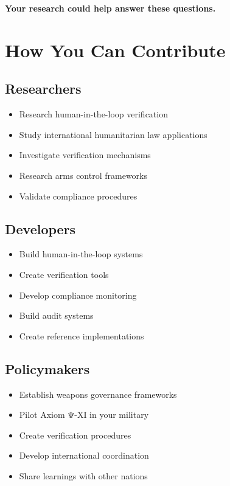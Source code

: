 \textbf{Your research could help answer these questions.}

\vspace{0.5cm}

\section{How You Can Contribute}

\subsection{Researchers}

\begin{itemize}
    \item Research human-in-the-loop verification
    \item Study international humanitarian law applications
    \item Investigate verification mechanisms
    \item Research arms control frameworks
    \item Validate compliance procedures
\end{itemize}

\subsection{Developers}

\begin{itemize}
    \item Build human-in-the-loop systems
    \item Create verification tools
    \item Develop compliance monitoring
    \item Build audit systems
    \item Create reference implementations
\end{itemize}

\subsection{Policymakers}

\begin{itemize}
    \item Establish weapons governance frameworks
    \item Pilot Axiom Ψ-XI in your military
    \item Create verification procedures
    \item Develop international coordination
    \item Share learnings with other nations
\end{itemize}

